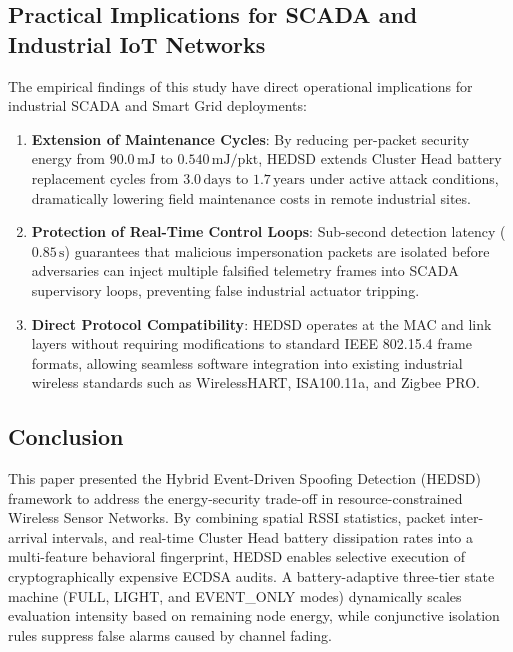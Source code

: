 \documentclass[conference]{IEEEtran}
\begin{document}
\begin{enumerate}
\subsection{Practical Implications for SCADA and Industrial IoT Networks}
The empirical findings of this study have direct operational implications for industrial SCADA and Smart Grid deployments:
\begin{enumerate}
    \item \textbf{Extension of Maintenance Cycles}: By reducing per-packet security energy from $90.0\,\text{mJ}$ to $0.540\,\text{mJ/pkt}$, HEDSD extends Cluster Head battery replacement cycles from $3.0\,\text{days}$ to $1.7\,\text{years}$ under active attack conditions, dramatically lowering field maintenance costs in remote industrial sites.
    \item \textbf{Protection of Real-Time Control Loops}: Sub-second detection latency ($0.85\,\text{s}$) guarantees that malicious impersonation packets are isolated before adversaries can inject multiple falsified telemetry frames into SCADA supervisory loops, preventing false industrial actuator tripping.
    \item \textbf{Direct Protocol Compatibility}: HEDSD operates at the MAC and link layers without requiring modifications to standard IEEE 802.15.4 frame formats, allowing seamless software integration into existing industrial wireless standards such as WirelessHART, ISA100.11a, and Zigbee PRO.
\end{enumerate}

\subsection{Conclusion}
This paper presented the Hybrid Event-Driven Spoofing Detection (HEDSD) framework to address the energy-security trade-off in resource-constrained Wireless Sensor Networks. By combining spatial RSSI statistics, packet inter-arrival intervals, and real-time Cluster Head battery dissipation rates into a multi-feature behavioral fingerprint, HEDSD enables selective execution of cryptographically expensive ECDSA audits. A battery-adaptive three-tier state machine (FULL, LIGHT, and EVENT\_ONLY modes) dynamically scales evaluation intensity based on remaining node energy, while conjunctive isolation rules suppress false alarms caused by channel fading.


\end{enumerate}
\end{document}
